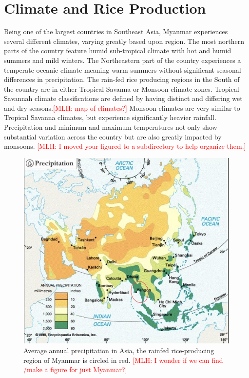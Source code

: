 \documentclass{book}\usepackage{knitr}
\newcommand{\red}[1]{\textcolor{red}{[MLH: #1]}}
\begin{document}
{\section{Climate and Rice Production}
Being one of the largest countries in Southeast Asia, Myanmar experiences several different climates, varying greatly based upon region. The most northern parts of the country feature humid sub-tropical climate with hot and humid summers and mild winters. The Northeastern part of the country experiences a temperate oceanic climate meaning warm summers without significant seasonal differences in precipitation. The rain-fed rice producing regions in the South of the country are in either Tropical Savanna or Monsoon climate zones. Tropical Savannah climate classifications are defined by having distinct and differing wet and dry seasons.\red{map of climates?} Monsoon climates are very similar to Tropical Savanna climates, but experience significantly heavier rainfall. Precipitation and minimum and maximum temperatures not only show substantial variation across the country but are also greatly impacted by monsoons. 
\red{I moved your figured to a subdirectory to help organize them.}
\begin{figure}
\includegraphics[width=\linewidth]{images/myanmar/Image1.jpg}
\caption{Average annual precipitation in Asia, the rainfed rice-producing region of Myanmar is circled in red. \red{I wonder if we can find /make a figure for just Myanmar?}}
\end{figure}



}
\end{document}
